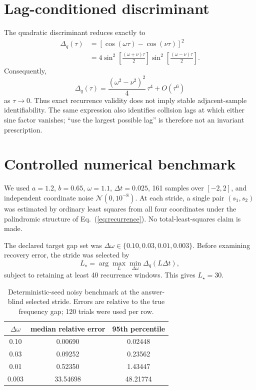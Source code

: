 \documentclass[aps,prd,preprint,nofootinbib]{revtex4-2}
\begin{document}
\section{Lag-conditioned discriminant}

The quadratic discriminant reduces exactly to
\begin{align}
\Delta_q(\tau)
&=
\left[\cos(\omega\tau)-\cos(\nu\tau)\right]^2\\
&=
4\sin^2\!\left[\frac{(\omega+\nu)\tau}2\right]
 \sin^2\!\left[\frac{(\omega-\nu)\tau}2\right].
\label{eq:disc}
\end{align}
Consequently,
\begin{equation}
\Delta_q(\tau)
=
\frac{(\omega^2-\nu^2)^2}4\,\tau^4
+O(\tau^6)
\end{equation}
as $\tau\rightarrow0$.
Thus exact recurrence validity does not imply stable adjacent-sample
identifiability.  The same expression also identifies collision lags at which
either sine factor vanishes; ``use the largest possible lag'' is therefore
not an invariant prescription.

\section{Controlled numerical benchmark}

We used $a=1.2$, $b=0.65$, $\omega=1.1$, $\Delta t=0.025$,
161 samples over $[-2,2]$, and independent coordinate noise
$\mathcal N(0,10^{-8})$.  At each stride, a single pair $(s_1,s_2)$ was
estimated by ordinary least squares from all four coordinates under the
palindromic structure of Eq.~(\ref{eq:recurrence}).  No total-least-squares
claim is made.

The declared target gap set was
$\Delta\omega\in\{0.10,0.03,0.01,0.003\}$.
Before examining recovery error, the stride was selected by
\begin{equation}
L_\star=
\arg\max_L
\min_{\Delta\omega}
\Delta_q(L\Delta t),
\end{equation}
subject to retaining at least 40 recurrence windows.  This gives
$L_\star=30$.

\begin{table}[b]
\caption{Deterministic-seed noisy benchmark at the answer-blind selected stride.
Errors are relative to the true frequency gap; 120 trials were used per row.}
\centering
\begin{ruledtabular}
\begin{tabular}{ccc}
$\Delta\omega$ & median relative error & 95th percentile\\
\hline
0.10  & 0.00690 & 0.02448\\
0.03  & 0.09252 & 0.23562\\
0.01  & 0.52350 & 1.43447\\
0.003 & 33.54698 & 48.21774\\
\end{tabular}
\end{ruledtabular}
\end{table}
\end{document}
